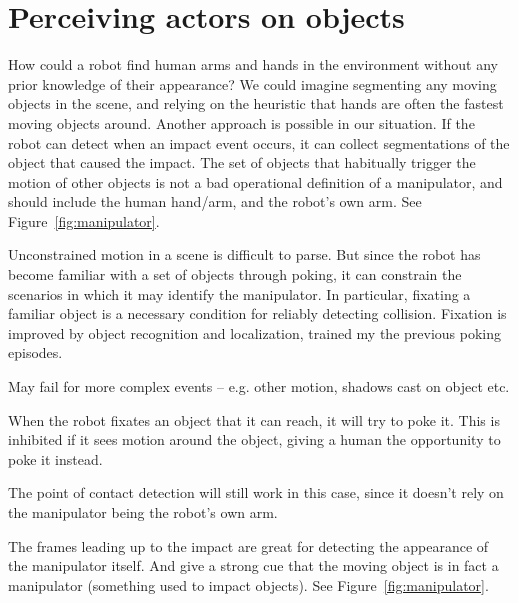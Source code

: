 
\section{Perceiving actors on objects}

\label{sect:manipulator}

How could a robot find human arms and hands in the environment without
any prior knowledge of their appearance?  We could imagine segmenting
any moving objects in the scene, and relying on the heuristic that
hands are often the fastest moving objects around.
Another approach is possible in our situation.  If the robot can
detect when an impact event occurs, it can collect segmentations of the
object that caused the impact.  The set of objects that habitually
trigger the motion of other objects is not a bad operational 
definition of a manipulator, and should include the human hand/arm,
and the robot's own arm.  See Figure~\ref{fig:manipulator}.

\ifverbose

Unconstrained motion in a scene is difficult to parse.  But since the
robot has become familiar with a set of objects through poking, it can
constrain the scenarios in which it may identify the manipulator.  In
particular, fixating a familiar object is a necessary condition for
reliably detecting collision.  Fixation is improved by object recognition
and localization, trained my the previous poking episodes.

May fail for more complex events -- e.g. other motion, shadows cast on
object etc.

When the robot fixates an object that it can reach, it will try to poke it.
This is inhibited if it sees motion around the object, giving a human the
opportunity to poke it instead.

The point of contact detection will still work in this case, since it 
doesn't rely on the manipulator being the robot's own arm.

The frames leading up to the impact are great for detecting the
appearance of the manipulator itself.  And give a strong cue that the
moving object is in fact a manipulator (something used to impact
objects).  See Figure~\ref{fig:manipulator}.

\fi

